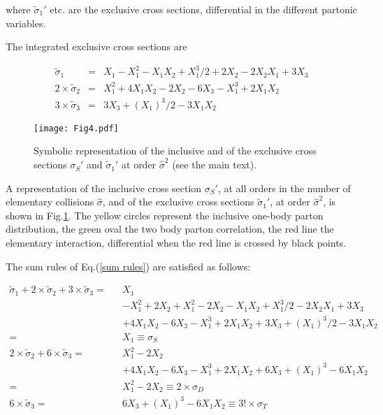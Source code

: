 \documentclass{ws-rv9x6}
\begin{document}
\noindent where $\tilde\sigma_1'$ etc. are the exclusive cross sections, differential in the different partonic variables.  

The integrated exclusive cross sections are

\begin{eqnarray}
\tilde\sigma_1&=&X_1-X_1^2-X_1X_2+X_1^3/2+2X_2-2X_2X_1+3X_3\nonumber\\
2\times\tilde\sigma_2&=&X_1^2+4X_1X_2-2X_2-6X_3-X_1^3+2X_1X_2\\
3\times\tilde\sigma_3&=&3X_3+(X_1)^3/2-3X_1X_2\nonumber
\end{eqnarray}


\begin{figure}[htp]
\centering
\texttt{[image: Fig4.pdf]}
\vspace{0cm}
\caption{Symbolic representation of the inclusive and of the exclusive cross sections $\sigma_S'$ and $\tilde\sigma_1'$ at order $\hat\sigma^2$ (see the main text).}
\label{fig:correlations}
\end{figure}

\vspace{-.1in}
A representation of the inclusive cross section $\sigma_S'$, at all orders in the number of elementary collisions  $\hat\sigma$, and of the exclusive cross sections $\tilde\sigma_1'$, at order $\hat\sigma^2$, is shown in Fig.\ref{fig:correlations}. The yellow circles represent the inclusive one-body parton distribution, the green oval the two body parton correlation, the red line the elementary interaction, differential when the red line is crossed by black points.


\noindent The sum rules of Eq.(\ref{sum rules}) are satisfied as follows:

\begin{eqnarray}\label{exclusive}
\tilde\sigma_1+2\times\tilde\sigma_2+3\times\tilde\sigma_3=&&X_1\nonumber\\&&-X_1^2+2X_2+X_1^2-2X_2-X_1X_2+X_1^3/2-2X_2X_1+3X_3\nonumber\\
&&+4X_1X_2-6X_3-X_1^3+2X_1X_2+3X_3+(X_1)^3/2-3X_1X_2\nonumber\\
=&&X_1\equiv\sigma_S
\\
2\times\tilde\sigma_2+6\times\tilde\sigma_3
=&&X_1^2-2X_2\nonumber\\
&&+4X_1X_2-6X_3-X_1^3+2X_1X_2+6X_3+(X_1)^3-6X_1X_2\nonumber\\
=&&X_1^2-2X_2\equiv2\times\sigma_D
\nonumber\\
6\times\tilde\sigma_3=&&6X_3+(X_1)^3-6X_1X_2
\equiv3!\times\sigma_T\nonumber
\end{eqnarray}
\end{document}
